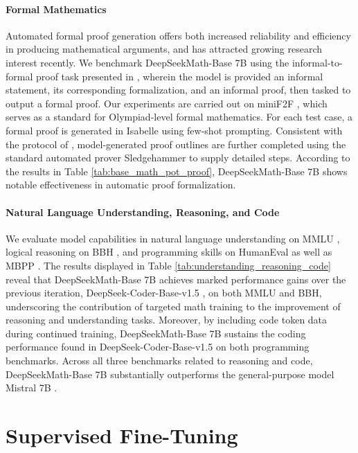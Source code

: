 \paragraph{Formal Mathematics}

Automated formal proof generation offers both increased reliability and efficiency in producing mathematical arguments, and has attracted growing research interest recently. We benchmark DeepSeekMath-Base 7B using the informal-to-formal proof task presented in \citep{dsp_proof}, wherein the model is provided an informal statement, its corresponding formalization, and an informal proof, then tasked to output a formal proof. Our experiments are carried out on miniF2F \citep{minif2f}, which serves as a standard for Olympiad-level formal mathematics. For each test case, a formal proof is generated in Isabelle using few-shot prompting. Consistent with the protocol of \cite{dsp_proof}, model-generated proof outlines are further completed using the standard automated prover Sledgehammer \citep{sledgehammer} to supply detailed steps. According to the results in Table \ref{tab:base_math_pot_proof}, DeepSeekMath-Base 7B shows notable effectiveness in automatic proof formalization.

\paragraph{Natural Language Understanding, Reasoning, and Code}

We evaluate model capabilities in natural language understanding on MMLU \citep{mmlu}, logical reasoning on BBH \citep{bbh}, and programming skills on HumanEval \citep{codex} as well as MBPP \citep{mbpp}. The results displayed in Table \ref{tab:understanding_reasoning_code} reveal that DeepSeekMath-Base 7B achieves marked performance gains over the previous iteration, DeepSeek-Coder-Base-v1.5 \citep{deepseek-coder}, on both MMLU and BBH, underscoring the contribution of targeted math training to the improvement of reasoning and understanding tasks. Moreover, by including code token data during continued training, DeepSeekMath-Base 7B sustains the coding performance found in DeepSeek-Coder-Base-v1.5 on both programming benchmarks. Across all three benchmarks related to reasoning and code, DeepSeekMath-Base 7B substantially outperforms the general-purpose model Mistral 7B \citep{mistral}.

\section{Supervised Fine-Tuning}


